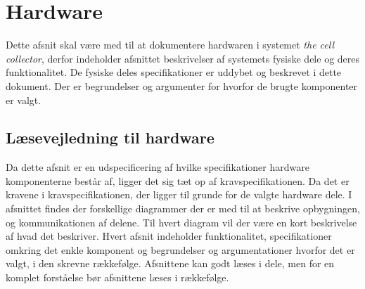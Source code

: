  \section{Hardware}
Dette afsnit skal være med til at dokumentere hardwaren i systemet \textit{the cell collector}, derfor indeholder afsnittet beskrivelser af systemets fysiske dele og deres funktionalitet. De fysiske deles specifikationer er uddybet og beskrevet i dette dokument. Der er begrundelser og argumenter for hvorfor de brugte komponenter er valgt.

\subsection{Læsevejledning til hardware}
Da dette afsnit er en udspecificering af hvilke specifikationer hardware komponenterne består af, ligger det sig tæt op af kravspecifikationen. Da det er kravene i kravspecifikationen, der ligger til grunde for de valgte hardware dele. I afsnittet findes der forskellige diagrammer der er med til at beskrive opbygningen, og kommunikationen af delene. Til hvert diagram vil der være en kort beskrivelse af hvad det beskriver. Hvert afsnit indeholder funktionalitet, specifikationer omkring det enkle komponent og begrundelser og argumentationer hvorfor det er valgt, i den skrevne rækkefølge. Afsnittene kan godt læses i dele, men for en komplet forståelse bør afsnittene læses i rækkefølge. 

